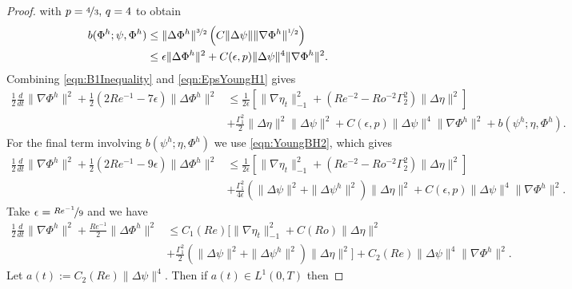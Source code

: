 \begin{proof}
  with $p=\nicefrac{4}{3},\, q = 4$ to obtain
  \begin{align}
    b(\Phi^h; \psi, \Phi^h) &\le \|\Delta \Phi^h\|^{\nicefrac{3}{2}}\left(C
      \|\Delta \psi\| \|\nabla \Phi^h\|^{\nicefrac{1}{2}}\right) \nonumber \\
    &\le \epsilon \|\Delta \Phi^h\|^2 + C(\epsilon,p) \|\Delta \psi\|^4
      \|\nabla \Phi^h\|^2.
    \label{eqn:EpsYoungH1}
  \end{align}
  Combining \eqref{eqn:B1Inequality} and \eqref{eqn:EpsYoungH1} gives
  \begin{align*}
    \frac{1}{2} \frac{d}{dt} \|\nabla \Phi^h\|^2 + \frac{1}{2}\left(2Re^{-1} -
      7 \epsilon \right)\|\Delta \Phi^h\|^2
      &\le \frac{1}{2 \epsilon}\left[\|\nabla \eta_t\|_{-1}^2
      + \left( Re^{-2} - Ro^{-2} \Gamma_2^2 \right) \|\Delta \eta\|^2\right] \\
    & + \frac{\Gamma_1^2}{2}\|\Delta \eta\|^2 \|\Delta \psi\|^2
      + C(\epsilon, p) \|\Delta \psi\|^4 \|\nabla \Phi^h\|^2
      + b(\psi^h;\eta,\Phi^h).
  \end{align*}
  For the final term involving $b(\psi^h; \eta, \Phi^h)$ we use
  \eqref{eqn:YoungBH2}, which gives
  \begin{align*}
    \frac{1}{2} \frac{d}{dt} \|\nabla \Phi^h\|^2 + \frac{1}{2}\left(2Re^{-1} -
      9 \epsilon \right)\|\Delta \Phi^h\|^2
      &\le \frac{1}{2 \epsilon}\left[\|\nabla \eta_t\|_{-1}^2
      + \left( Re^{-2} - Ro^{-2} \Gamma_2^2 \right) \|\Delta \eta\|^2\right] \\
    & + \frac{\Gamma_1^2}{4 \epsilon}
      \left( \|\Delta \psi\|^2 +  \|\Delta \psi^h\|^2\right) \|\Delta \eta\|^2
      + C(\epsilon, p) \|\Delta \psi\|^4 \|\nabla \Phi^h\|^2.
  \end{align*}
  Take $\epsilon = \nicefrac{Re^{-1}}{9}$ and we have
  \begin{equation}
    \begin{split}
      \frac{1}{2} \frac{d}{dt} \|\nabla \Phi^h\|^2
        + \frac{Re^{-1}}{2} \|\Delta \Phi^h\|^2
        & \le C_1(Re) \biggl[\|\nabla \eta_t\|_{-1}^2
         + C(Ro) \|\Delta \eta\|^2 \\
      & + \frac{\Gamma_1^2}{2}
        \left( \|\Delta \psi\|^2 +  \|\Delta \psi^h\|^2\right)
        \|\Delta \eta\|^2\biggr] + C_2(Re) \|\Delta \psi\|^4 \|\nabla \Phi^h\|^2.
    \end{split}
    \label{eqn:NoEps}
  \end{equation}
  Let $a(t):= C_2(Re) \|\Delta \psi\|^4$. Then if $a(t) \in L^1(0,T)$ then

\end{proof}
